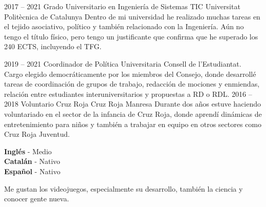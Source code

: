 \documentclass[9pt]{developercv} %
\begin{document}
\clearpage



\begin{entrylist}
	\entry
	{2017 -- 2021}
	{Grado Universitario en Ingeniería de Sistemas TIC}
	{Universitat Politècnica de Catalunya}
	{Dentro de mi universidad he realizado muchas tareas en el tejido asociativo, político y también relacionado con la Ingeniería. Aún no tengo el título físico, pero tengo un justificante que confirma que he superado los 240 ECTS, incluyendo el TFG.}
\end{entrylist}


\begin{entrylist}
	\entry
	{2019 -- 2021}
	{Coordinador de Política Universitaria}
	{Consell de l'Estudiantat.}
	{Cargo elegido democráticamente por los miembros del Consejo, donde desarrollé tareas de coordinación de grupos de trabajo, redacción de mociones y enmiendas, relación entre estudiantes interuniversitarios y propuestas a RD o RDL.}
	\entry
	{2016 -- 2018}
	{Voluntario Cruz Roja}
	{Cruz Roja Manresa}
	{Durante dos años estuve haciendo voluntariado en el sector de la infancia de Cruz Roja, donde aprendí dinámicas de entretenimiento para niños y también a trabajar en equipo en otros sectores como Cruz Roja Juventud. \\ }
\end{entrylist}


\begin{minipage}[t]{0.3\textwidth}
	\vspace{-\baselineskip} %


	\textbf{Inglés} - Medio\\
	\textbf{Catalán} - Nativo\\
	\textbf{Español} - Nativo\\
\end{minipage}
\hfill
\begin{minipage}[t]{0.3\textwidth}
	\vspace{-\baselineskip} %


	Me gustan los videojuegos, especialmente su desarrollo, también la ciencia y conocer gente nueva.

\end{minipage}
\hfill

\end{document}
